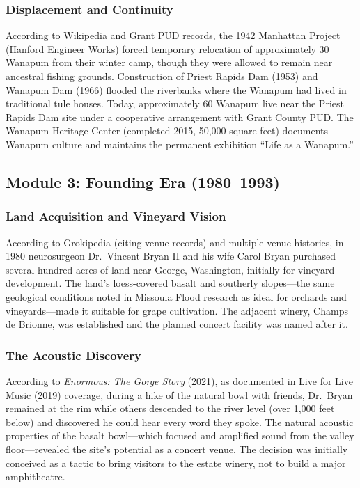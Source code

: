 \documentclass[11pt,letterpaper]{article}
\begin{document}
\subsubsection{Displacement and Continuity}

According to Wikipedia and Grant PUD records, the 1942 Manhattan Project (Hanford Engineer Works) forced temporary relocation of approximately 30 Wanapum from their winter camp, though they were allowed to remain near ancestral fishing grounds. Construction of Priest Rapids Dam (1953) and Wanapum Dam (1966) flooded the riverbanks where the Wanapum had lived in traditional tule houses. Today, approximately 60 Wanapum live near the Priest Rapids Dam site under a cooperative arrangement with Grant County PUD. The Wanapum Heritage Center (completed 2015, 50,000 square feet) documents Wanapum culture and maintains the permanent exhibition ``Life as a Wanapum.''

\subsection{Module 3: Founding Era (1980--1993)}

\subsubsection{Land Acquisition and Vineyard Vision}

According to Grokipedia (citing venue records) and multiple venue histories, in 1980 neurosurgeon Dr.\ Vincent Bryan II and his wife Carol Bryan purchased several hundred acres of land near George, Washington, initially for vineyard development. The land's loess-covered basalt and southerly slopes---the same geological conditions noted in Missoula Flood research as ideal for orchards and vineyards---made it suitable for grape cultivation. The adjacent winery, Champs de Brionne, was established and the planned concert facility was named after it.

\subsubsection{The Acoustic Discovery}

According to \textit{Enormous: The Gorge Story} (2021), as documented in Live for Live Music (2019) coverage, during a hike of the natural bowl with friends, Dr.\ Bryan remained at the rim while others descended to the river level (over 1,000 feet below) and discovered he could hear every word they spoke. The natural acoustic properties of the basalt bowl---which focused and amplified sound from the valley floor---revealed the site's potential as a concert venue. The decision was initially conceived as a tactic to bring visitors to the estate winery, not to build a major amphitheatre.
\end{document}

